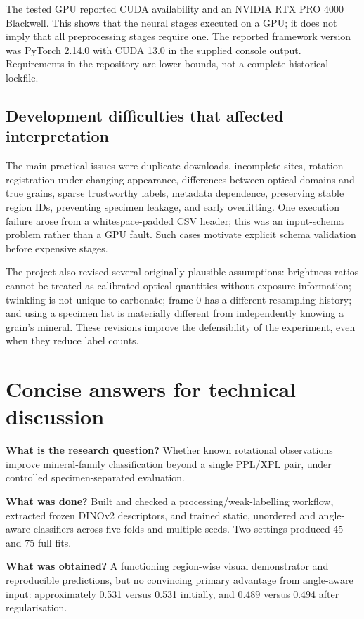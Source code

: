 The tested GPU reported CUDA availability and an NVIDIA RTX PRO 4000 Blackwell. This shows that the neural stages executed on a GPU; it does not imply that all preprocessing stages require one. The reported framework version was PyTorch 2.14.0 with CUDA 13.0 in the supplied console output. Requirements in the repository are lower bounds, not a complete historical lockfile.

\subsection{Development difficulties that affected interpretation}
The main practical issues were duplicate downloads, incomplete sites, rotation registration under changing appearance, differences between optical domains and true grains, sparse trustworthy labels, metadata dependence, preserving stable region IDs, preventing specimen leakage, and early overfitting. One execution failure arose from a whitespace-padded  CSV header; this was an input-schema problem rather than a GPU fault. Such cases motivate explicit schema validation before expensive stages.

The project also revised several originally plausible assumptions: brightness ratios cannot be treated as calibrated optical quantities without exposure information; twinkling is not unique to carbonate; frame 0 has a different resampling history; and using a specimen list is materially different from independently knowing a grain's mineral. These revisions improve the defensibility of the experiment, even when they reduce label counts.

\section{Concise answers for technical discussion}
\textbf{What is the research question?} Whether known rotational observations improve mineral-family classification beyond a single PPL/XPL pair, under controlled specimen-separated evaluation.

\textbf{What was done?} Built and checked a processing/weak-labelling workflow, extracted frozen DINOv2 descriptors, and trained static, unordered and angle-aware classifiers across five folds and multiple seeds. Two settings produced 45 and 75 full fits.

\textbf{What was obtained?} A functioning region-wise visual demonstrator and reproducible predictions, but no convincing primary advantage from angle-aware input: approximately 0.531 versus 0.531 initially, and 0.489 versus 0.494 after regularisation.

